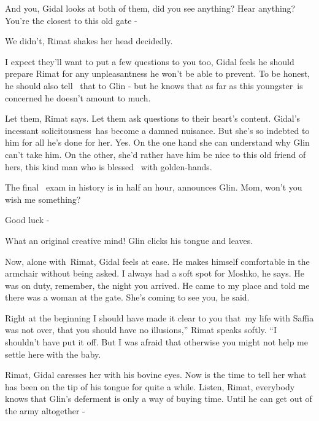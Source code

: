 \documentclass[12pt]{book}
\begin{document}
{\textquotedbl}And you,{\textquotedbl} Gidal looks at both of them, {\textquotedbl}did you see anything? Hear anything?
You're the closest to this old gate -{\textquotedbl}

{\textquotedbl}We didn't,{\textquotedbl} Rimat shakes her head decidedly.

{\textquotedbl}I expect they'll want to put a few questions to you too,{\textquotedbl} Gidal feels he should prepare
Rimat for any unpleasantness he won't be able to prevent. To be honest, he should also tell \ that to Glin - but he
knows that as far as this youngster~is concerned he doesn't amount to much.

{\textquotedbl}Let them,{\textquotedbl} Rimat says. {\textquotedbl}Let them ask questions to their heart's
content.{\textquotedbl} Gidal's incessant solicitousness~has become a damned nuisance. But she's so indebted to him for
all he's done for her. Yes. On the one hand she can understand why Glin can't take him. On the other, she'd rather have
him be nice to this old friend of hers, this kind man who is blessed \ with golden-hands.

{\textquotedbl}The final \ exam in history is in half an hour,{\textquotedbl} announces Glin. {\textquotedbl}Mom, won't
you wish me something?{\textquotedbl}

{\textquotedbl}Good luck -{\textquotedbl}

{\textquotedbl}What an original creative mind!{\textquotedbl} Glin clicks his tongue and leaves.

Now, alone with~Rimat, Gidal feels at ease. He makes himself comfortable in the armchair without being asked.
{\textquotedbl}I always had a soft spot for Moshko,{\textquotedbl} he says. {\textquotedbl}He was on duty, remember,
the night you arrived. He came to my place and told me there was a woman at the gate. She's coming to see you, he
said.{\textquotedbl}

{\textquotedbl}Right at the beginning I should have made it clear to you that~my life with Saffia was not over, that you
should have no illusions,'' Rimat speaks softly. ``I shouldn't have put it off. But I was afraid that otherwise you
might not help me settle here with the baby.{\textquotedbl}

{\textquotedbl}Rimat,{\textquotedbl} Gidal caresses her with his bovine eyes. Now is the time to tell her what has been
on the tip of his tongue for quite{ }a while. {\textquotedbl}Listen, Rimat, everybody knows that Glin's
deferment is only a way of buying time. Until he can get out of the army altogether -{\textquotedbl}
\end{document}

